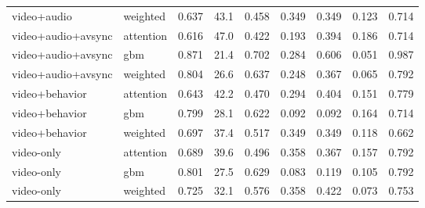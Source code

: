 \begin{tabular}{llrrrrrrr}
video+audio & weighted & 0.637 & 43.1 & 0.458 & 0.349 & 0.349 & 0.123 & 0.714 \\
video+audio+avsync & attention & 0.616 & 47.0 & 0.422 & 0.193 & 0.394 & 0.186 & 0.714 \\
video+audio+avsync & gbm & 0.871 & 21.4 & 0.702 & 0.284 & 0.606 & 0.051 & 0.987 \\
video+audio+avsync & weighted & 0.804 & 26.6 & 0.637 & 0.248 & 0.367 & 0.065 & 0.792 \\
video+behavior & attention & 0.643 & 42.2 & 0.470 & 0.294 & 0.404 & 0.151 & 0.779 \\
video+behavior & gbm & 0.799 & 28.1 & 0.622 & 0.092 & 0.092 & 0.164 & 0.714 \\
video+behavior & weighted & 0.697 & 37.4 & 0.517 & 0.349 & 0.349 & 0.118 & 0.662 \\
video-only & attention & 0.689 & 39.6 & 0.496 & 0.358 & 0.367 & 0.157 & 0.792 \\
video-only & gbm & 0.801 & 27.5 & 0.629 & 0.083 & 0.119 & 0.105 & 0.792 \\
video-only & weighted & 0.725 & 32.1 & 0.576 & 0.358 & 0.422 & 0.073 & 0.753 \\
\bottomrule
\end{tabular}
